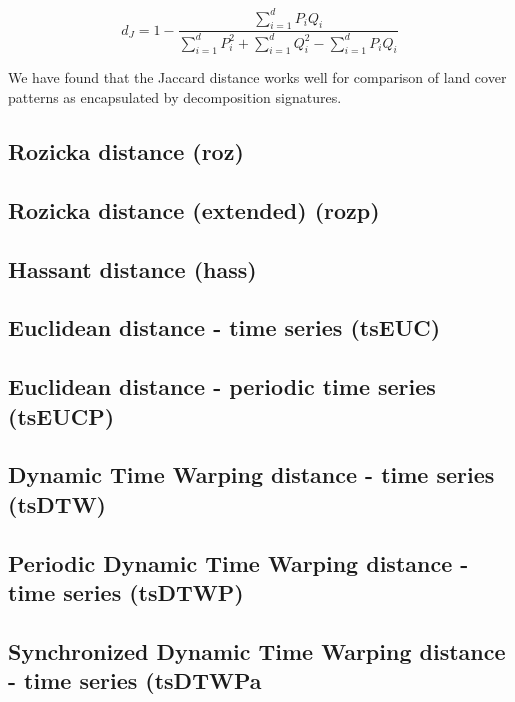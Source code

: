 \begin{equation} \label{eq:Jaccard}
d_J= 1-\dfrac
{\sum\limits_{i=1}^{d} P_i Q_i}
{\sum\limits_{i=1}^{d} P_i^2 + \sum\limits_{i=1}^{d} Q_i^2 - \sum\limits_{i=1}^{d} P_i Q_i}
\end{equation}

\noindent We have found that the Jaccard distance works well for comparison of land cover patterns as encapsulated by decomposition signatures.

\subsection{Rozicka distance (roz)}


\subsection{Rozicka distance (extended) (rozp)}

\subsection{Hassant distance (hass)}

\subsection{Euclidean distance - time series (tsEUC)}

\subsection{Euclidean distance - periodic time series (tsEUCP)}

\subsection{Dynamic Time Warping distance - time series (tsDTW)}

\subsection{Periodic Dynamic Time Warping distance - time series (tsDTWP)}

\subsection{Synchronized Dynamic Time Warping distance - time series (tsDTWPa}